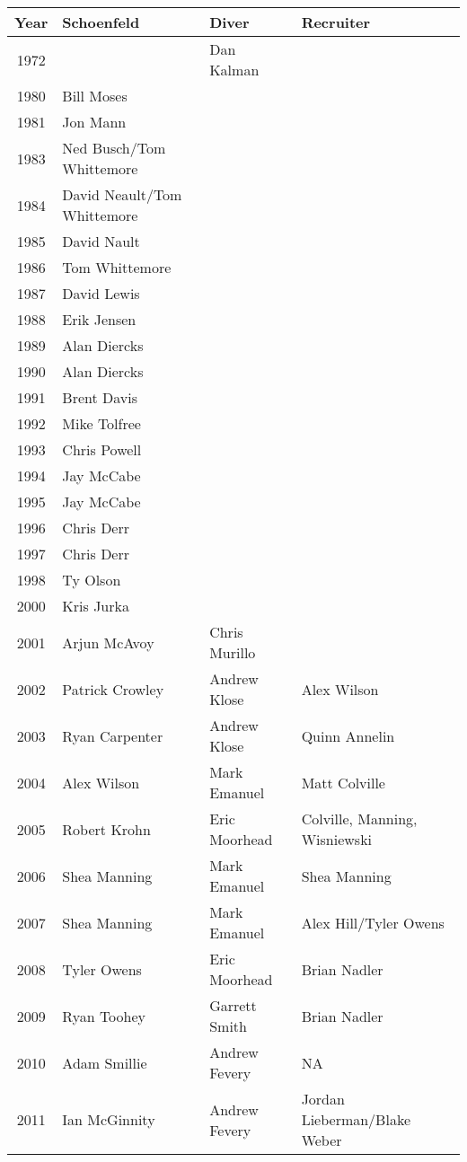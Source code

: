 \begin{table}[htbp]
\centering
\scriptsize
\begin{tabular}{c l l l}
\toprule
Year & Schoenfeld & Diver & Recruiter \\
\midrule
1972 &  & Dan Kalman &  \\
1980 & Bill Moses &  &  \\
1981 & Jon Mann &  &  \\
1983 & Ned Busch/Tom Whittemore &  &  \\
1984 & David Neault/Tom Whittemore &  &  \\
1985 & David Nault &  &  \\
1986 & Tom Whittemore &  &  \\
1987 & David Lewis &  &  \\
1988 & Erik Jensen &  &  \\
1989 & Alan Diercks &  &  \\
1990 & Alan Diercks &  &  \\
1991 & Brent Davis &  &  \\
1992 & Mike Tolfree &  &  \\
1993 & Chris Powell &  &  \\
1994 & Jay McCabe &  &  \\
1995 & Jay McCabe &  &  \\
1996 & Chris Derr &  &  \\
1997 & Chris Derr &  &  \\
1998 & Ty Olson &  &  \\
2000 & Kris Jurka &  &  \\
2001 & Arjun McAvoy & Chris Murillo &  \\
2002 & Patrick Crowley & Andrew Klose & Alex Wilson \\
2003 & Ryan Carpenter & Andrew Klose & Quinn Annelin \\
2004 & Alex Wilson & Mark Emanuel & Matt Colville \\
2005 & Robert Krohn & Eric Moorhead & Colville, Manning, Wisniewski \\
2006 & Shea Manning & Mark Emanuel & Shea Manning \\
2007 & Shea Manning & Mark Emanuel & Alex Hill/Tyler Owens \\
2008 & Tyler Owens & Eric Moorhead & Brian Nadler \\
2009 & Ryan Toohey & Garrett Smith & Brian Nadler \\
2010 & Adam Smillie & Andrew Fevery & NA \\
2011 & Ian McGinnity & Andrew Fevery & Jordan Lieberman/Blake Weber \\

\end{tabular}
\end{table}
